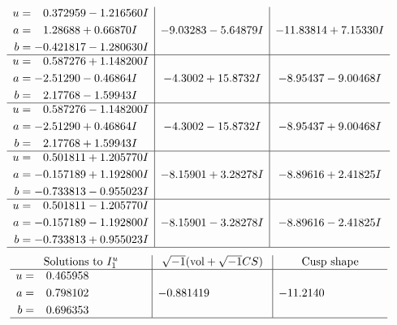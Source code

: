 \documentclass[1p]{elsarticle_modified}
\theoremstyle{definition}
\newcommand{\I}{\sqrt{-1}}
\begin{document}
$$\begin{array}{c|c|c}
\begin{aligned}
u &= \phantom{-}0.372959 - 1.216560 I \\
a &= \phantom{-}1.28688 + 0.66870 I \\
b &= -0.421817 - 1.280630 I\end{aligned}
 & -9.03283 - 5.64879 I & -11.83814 + 7.15330 I \\ \hline\begin{aligned}
u &= \phantom{-}0.587276 + 1.148200 I \\
a &= -2.51290 - 0.46864 I \\
b &= \phantom{-}2.17768 - 1.59943 I\end{aligned}
 & -4.3002 + 15.8732 I & -8.95437 - 9.00468 I \\ \hline\begin{aligned}
u &= \phantom{-}0.587276 - 1.148200 I \\
a &= -2.51290 + 0.46864 I \\
b &= \phantom{-}2.17768 + 1.59943 I\end{aligned}
 & -4.3002 - 15.8732 I & -8.95437 + 9.00468 I \\ \hline\begin{aligned}
u &= \phantom{-}0.501811 + 1.205770 I \\
a &= -0.157189 + 1.192800 I \\
b &= -0.733813 - 0.955023 I\end{aligned}
 & -8.15901 + 3.28278 I & -8.89616 + 2.41825 I \\ \hline\begin{aligned}
u &= \phantom{-}0.501811 - 1.205770 I \\
a &= -0.157189 - 1.192800 I \\
b &= -0.733813 + 0.955023 I\end{aligned}
 & -8.15901 - 3.28278 I & -8.89616 - 2.41825 I\\
 \hline 
 \end{array}$$\newpage$$\begin{array}{c|c|c}  
\text{Solutions to }I^u_{1}& \I (\text{vol} + \sqrt{-1}CS) & \text{Cusp shape}\\
 \hline 
\begin{aligned}
u &= \phantom{-}0.465958\phantom{ +0.000000I} \\
a &= \phantom{-}0.798102\phantom{ +0.000000I} \\
b &= \phantom{-}0.696353\phantom{ +0.000000I}\end{aligned}
 & -0.881419\phantom{ +0.000000I} & -11.2140\phantom{ +0.000000I}\\
 \hline 
 \end{array}$$\newpage\newpage\renewcommand{\arraystretch}{1}
\end{document}
